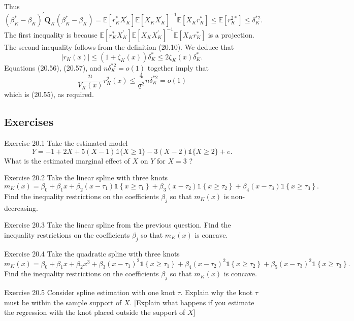 \documentclass[10pt]{article}
\begin{document}
Thus
$$
\left(\beta_{K}^{*}-\beta_{K}\right)^{\prime} \boldsymbol{Q}_{K}\left(\beta_{K}^{*}-\beta_{K}\right)=\mathbb{E}\left[r_{K}^{*} X_{K}^{\prime}\right] \mathbb{E}\left[X_{K} X_{K}^{\prime}\right]^{-1} \mathbb{E}\left[X_{K} r_{K}^{*}\right] \leq \mathbb{E}\left[r_{K}^{2 *}\right] \leq \delta_{K}^{* 2} .
$$
The first inequality is because $\mathbb{E}\left[r_{K}^{*} X_{K}^{\prime}\right] \mathbb{E}\left[X_{K} X_{K}^{\prime}\right]^{-1} \mathbb{E}\left[X_{K} r_{K}^{*}\right]$ is a projection. The second inequality follows from the definition (20.10). We deduce that
$$
\left|r_{K}(x)\right| \leq\left(1+\zeta_{K}(x)\right) \delta_{K}^{*} \leq 2 \zeta_{K}(x) \delta_{K}^{*} .
$$
Equations (20.56), (20.57), and $n \delta_{K}^{* 2}=o(1)$ together imply that
$$
\frac{n}{V_{K}(x)} r_{K}^{2}(x) \leq \frac{4}{\underline{\sigma}^{2}} n \delta_{K}^{* 2}=o(1)
$$
which is (20.55), as required.

\subsection{Exercises}
Exercise 20.1 Take the estimated model
$$
Y=-1+2 X+5(X-1) \mathbb{1}\{X \geq 1\}-3(X-2) \mathbb{1}\{X \geq 2\}+e .
$$
What is the estimated marginal effect of $X$ on $Y$ for $X=3$ ?

Exercise 20.2 Take the linear spline with three knots
$$
m_{K}(x)=\beta_{0}+\beta_{1} x+\beta_{2}\left(x-\tau_{1}\right) \mathbb{1}\left\{x \geq \tau_{1}\right\}+\beta_{3}\left(x-\tau_{2}\right) \mathbb{1}\left\{x \geq \tau_{2}\right\}+\beta_{4}\left(x-\tau_{3}\right) \mathbb{1}\left\{x \geq \tau_{3}\right\} .
$$
Find the inequality restrictions on the coefficients $\beta_{j}$ so that $m_{K}(x)$ is non-decreasing.

Exercise 20.3 Take the linear spline from the previous question. Find the inequality restrictions on the coefficients $\beta_{j}$ so that $m_{K}(x)$ is concave.

Exercise 20.4 Take the quadratic spline with three knots
$$
m_{K}(x)=\beta_{0}+\beta_{1} x+\beta_{2} x^{3}+\beta_{3}\left(x-\tau_{1}\right)^{2} \mathbb{1}\left\{x \geq \tau_{1}\right\}+\beta_{4}\left(x-\tau_{2}\right)^{2} \mathbb{1}\left\{x \geq \tau_{2}\right\}+\beta_{5}\left(x-\tau_{3}\right)^{2} \mathbb{1}\left\{x \geq \tau_{3}\right\} .
$$
Find the inequality restrictions on the coefficients $\beta_{j}$ so that $m_{K}(x)$ is concave.

Exercise 20.5 Consider spline estimation with one knot $\tau$. Explain why the knot $\tau$ must be within the sample support of $X$. [Explain what happens if you estimate the regression with the knot placed outside the support of $X]$
\end{document}
